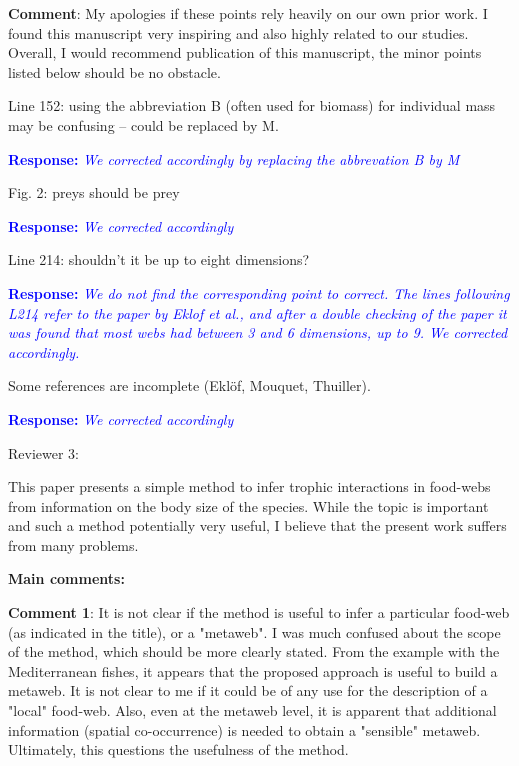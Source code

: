 \documentclass [12pt,onecolumn,twoside,openright]{report}
\begin{document}
\begin{onehalfspacing}
\medskip \textbf{Comment}: My apologies if these points rely
heavily on our own prior work. I found this manuscript very inspiring and also
highly related to our studies. Overall, I would recommend publication of this
manuscript, the minor points listed below should be no obstacle.

\medskip Line 152: using the abbreviation B (often used for
biomass) for individual mass may be confusing – could be replaced by M.

\textcolor{blue}{\textbf{Response:}} \textit{\textcolor{blue}{We corrected
accordingly by replacing the abbrevation B by M}}

\medskip Fig. 2: preys should be prey

\textcolor{blue}{\textbf{Response:}} \textit{\textcolor{blue}{We corrected
accordingly}}

\medskip Line 214: shouldn't it be up to eight dimensions?

\textcolor{blue}{\textbf{Response:}} \textit{\textcolor{blue}{We do not find the corresponding point to correct. The lines following L214 refer to the paper by Eklof et al., and after a double checking of the paper it was found that most webs had between 3 and 6 dimensions, up to 9. We corrected accordingly.}}

\medskip Some references are incomplete (Eklöf, Mouquet,
Thuiller). 

\textcolor{blue}{\textbf{Response:}} \textit{\textcolor{blue}{We corrected
accordingly}}



\begin{center} Reviewer 3: \end{center}

This paper presents a simple method to infer trophic interactions in food-webs
from information on the body size of the species. While the topic is important
and such a method potentially very useful, I believe that the present work
suffers from many problems.

\medskip \textbf{\large{Main comments:}}

\medskip \textbf{Comment 1}: It is not clear if the method is
useful to infer a particular food-web (as indicated in the title), or a
"metaweb". I was much confused about the scope of the method, which should be
more clearly stated. From the example with the Mediterranean fishes, it appears
that the proposed approach is useful to build a metaweb. It is not clear to me
if it could be of any use for the description of a "local" food-web. Also, even
at the metaweb level, it is apparent that additional information (spatial
co-occurrence) is needed to obtain a "sensible" metaweb. Ultimately, this
questions the usefulness of the method.


\end{onehalfspacing}
\end{document}

